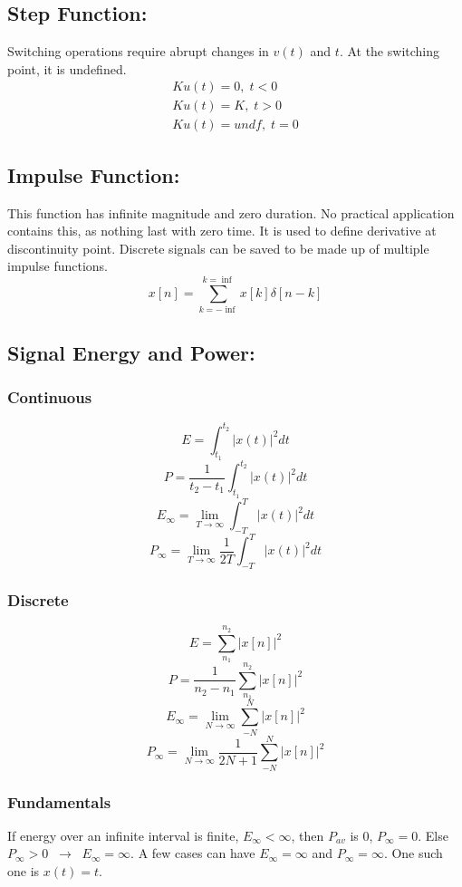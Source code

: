 \documentclass[a5paper]{article}
\begin{document}
	\subsection{Step Function:}
	Switching operations require abrupt changes in $v(t)$ and $t$. At the switching point, it is undefined.
	\begin{align*}
		Ku(t)=0,\;t<0\\
		Ku(t)=K,\;t>0\\
		Ku(t)=undf,\;t=0
	\end{align*}
	\subsection{Impulse Function:}
	This function has infinite magnitude and zero duration. No practical application contains this, as nothing last with zero time. It is used to define derivative at discontinuity point. Discrete signals can be saved to be made up of multiple impulse functions.
	$$x[n]=\sum^{k=\inf}_{k=-\inf}x[k]\delta[n-k]$$
	\subsection{Signal Energy and Power:}
	\subsubsection{Continuous}
	$$E=\int^{t_{2}}_{t_{1}}|x(t)|^{2}dt$$
	$$P=\frac{1}{t_{2}-t_{1}}\int^{t_{2}}_{t_{1}}|x(t)|^{2}dt$$
	$$E_{\infty}=\lim_{T\to\infty}\int^{T}_{-T}|x(t)|^{2}dt$$
	$$P_{\infty}=\lim_{T\to\infty}\frac{1}{2T}\int^{T}_{-T}|x(t)|^{2}dt$$
	\subsubsection{Discrete}
	$$E=\sum^{n_{2}}_{n_{1}}|x[n]|^{2}$$
	$$P=\frac{1}{n_{2}-n_{1}}\sum^{n_{2}}_{n_{1}}|x[n]|^{2}$$
	$$E_{\infty}=\lim_{N\to\infty}\sum^{N}_{-N}|x[n]|^{2}$$
	$$P_{\infty}=\lim_{N\to\infty}\frac{1}{2N+1}\sum^{N}_{-N}|x[n]|^{2}$$
	\subsubsection{Fundamentals}
	If energy over an infinite interval is finite, $E_{\infty}<\infty$, then $P_{av}$ is 0, $P_{\infty}=0$. Else $P_{\infty}>0\;\;\rightarrow\;\;E_{\infty}=\infty$. A few cases can have $E_{\infty}=\infty$ and $P_{\infty}=\infty$. One such one is $x(t)=t$.
\end{document}
